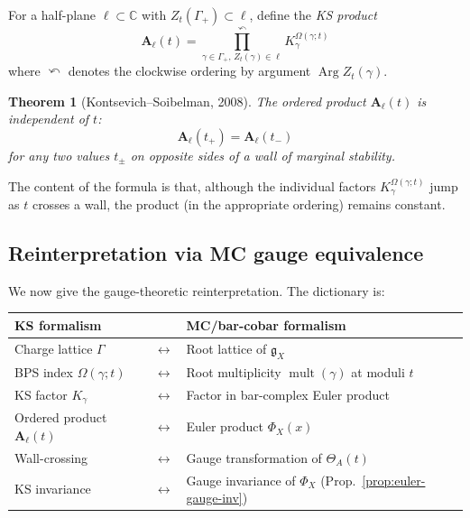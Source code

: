 \documentclass[11pt]{article}
\newtheorem{theorem}{Theorem}[section]
\theoremstyle{definition}
\theoremstyle{remark}
\newcommand{\frakg}{\mathfrak{g}}
\DeclareMathOperator{\mult}{mult}
\DeclareMathOperator{\Arg}{Arg}
\begin{document}
For a half-plane $\ell \subset \mathbb{C}$ with $Z_t(\Gamma_+) \subset
\ell$, define the \emph{KS product}
\begin{equation}\label{eq:ks-product}
 \mathbf{A}_\ell(t)
 = \prod_{\gamma \in \Gamma_+,\, Z_t(\gamma) \in \ell}^{\curvearrowleft}
 K_\gamma^{\Omega(\gamma; t)}
\end{equation}
where $\curvearrowleft$ denotes the clockwise ordering by argument
$\Arg Z_t(\gamma)$.

\begin{theorem}[Kontsevich--Soibelman, 2008]
\label{thm:ks-wcf}
The ordered product $\mathbf{A}_\ell(t)$ is independent of $t$:
\begin{equation}\label{eq:ks-invariance}
 \mathbf{A}_\ell(t_+) = \mathbf{A}_\ell(t_-)
\end{equation}
for any two values $t_\pm$ on opposite sides of a wall of marginal
stability.
\end{theorem}

The content of the formula is that, although the individual factors
$K_\gamma^{\Omega(\gamma; t)}$ jump as $t$ crosses a wall, the product
(in the appropriate ordering) remains constant.

\subsection{Reinterpretation via MC gauge equivalence}
\label{ssec:ks-mc-gauge}

We now give the gauge-theoretic reinterpretation. The dictionary is:

\medskip
\begin{center}
\renewcommand{\arraystretch}{1.3}
\begin{tabular}{lll}
 \textbf{KS formalism} & & \textbf{MC/bar-cobar formalism} \\
 \hline
 Charge lattice $\Gamma$ & $\longleftrightarrow$ &
 Root lattice of $\frakg_X$ \\
 BPS index $\Omega(\gamma; t)$ & $\longleftrightarrow$ &
 Root multiplicity $\mult(\gamma)$ at moduli $t$ \\
 KS factor $K_\gamma$ & $\longleftrightarrow$ &
 Factor in bar-complex Euler product \\
 Ordered product $\mathbf{A}_\ell(t)$ & $\longleftrightarrow$ &
 Euler product $\Phi_X(x)$ \\
 Wall-crossing & $\longleftrightarrow$ &
 Gauge transformation of $\Theta_A(t)$ \\
 KS invariance & $\longleftrightarrow$ &
 Gauge invariance of $\Phi_X$ (Prop.~\ref{prop:euler-gauge-inv}) \\
\end{tabular}
\end{center}
\medskip
\end{document}
